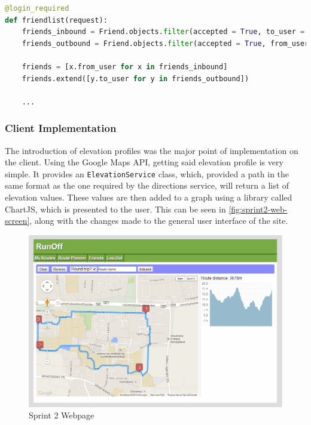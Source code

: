 \begin{lstlisting}[label={lst:sprint2-get-friends},caption={'Friend List' function},language={Python}]
@login_required
def friendlist(request):
	friends_inbound = Friend.objects.filter(accepted = True, to_user = request.user)
	friends_outbound = Friend.objects.filter(accepted = True, from_user = request.user)
	
	friends = [x.from_user for x in friends_inbound]
	friends.extend([y.to_user for y in friends_outbound])
	
	...
\end{lstlisting}

\subsubsection{Client Implementation}

The introduction of elevation profiles was the major point of implementation on the client. Using the Google Maps \ac{API}, getting said elevation profile is very simple. It provides an \texttt{ElevationService} class, which, provided a path in the same format as the one required by the directions service, will return a list of elevation values. These values are then added to a graph using a library called ChartJS\cite{chartjs}, which is presented to the user. This can be seen in \autoref{fig:sprint2-web-screen}, along with the changes made to the general user interface of the site.

\begin{figure}[ht]
 \caption{Sprint 2 Webpage}
 \label{fig:sprint2-web-screen}
 \includegraphics[width=\textwidth]{img/webplanner2.png}
\end{figure}

